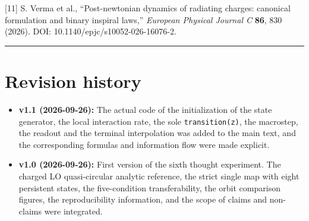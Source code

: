 \documentclass[
  a4paper,
]{article}
\providecommand{\tightlist}{%
  \setlength{\itemsep}{0pt}\setlength{\parskip}{0pt}}
\begin{document}
{[}11{]} S. Verma et al., ``Post-newtonian dynamics of radiating
charges: canonical formulation and binary inspiral laws,''
\emph{European Physical Journal C} \textbf{86}, 830 (2026). DOI:
10.1140/epjc/s10052-026-16076-2.

\begin{center}\rule{0.5\linewidth}{0.5pt}\end{center}

\section{Revision history}\label{revision-history}

\begin{itemize}
\tightlist
\item
  \textbf{v1.1 (2026-09-26):} The actual code of the initialization of
  the state generator, the local interaction rate, the sole
  \texttt{transition(z)}, the macrostep, the readout and the terminal
  interpolation was added to the main text, and the corresponding
  formulas and information flow were made explicit.
\item
  \textbf{v1.0 (2026-09-26):} First version of the sixth thought
  experiment. The charged LO quasi-circular analytic reference, the
  strict single map with eight persistent states, the five-condition
  transferability, the orbit comparison figures, the reproducibility
  information, and the scope of claims and non-claims were integrated.
\end{itemize}
\end{document}
